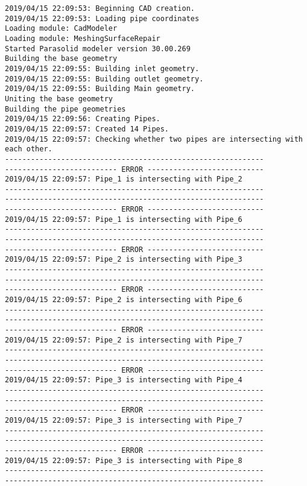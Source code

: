 \documentclass{article}
\begin{document}
{\tiny 
\begin{verbatim}
2019/04/15 22:09:53: Beginning CAD creation.
2019/04/15 22:09:53: Loading pipe coordinates
Loading module: CadModeler
Loading module: MeshingSurfaceRepair
Started Parasolid modeler version 30.00.269
Building the base geometry
2019/04/15 22:09:55: Building inlet geometry.
2019/04/15 22:09:55: Building outlet geometry.
2019/04/15 22:09:55: Building Main geometry.
Uniting the base geometry
Building the pipe geometries
2019/04/15 22:09:56: Creating Pipes.
2019/04/15 22:09:57: Created 14 Pipes.
2019/04/15 22:09:57: Checking whether two pipes are intersecting with each other.
------------------------------------------------------------
-------------------------- ERROR ---------------------------
2019/04/15 22:09:57: Pipe_1 is intersecting with Pipe_2
------------------------------------------------------------
------------------------------------------------------------
-------------------------- ERROR ---------------------------
2019/04/15 22:09:57: Pipe_1 is intersecting with Pipe_6
------------------------------------------------------------
------------------------------------------------------------
-------------------------- ERROR ---------------------------
2019/04/15 22:09:57: Pipe_2 is intersecting with Pipe_3
------------------------------------------------------------
------------------------------------------------------------
-------------------------- ERROR ---------------------------
2019/04/15 22:09:57: Pipe_2 is intersecting with Pipe_6
------------------------------------------------------------
------------------------------------------------------------
-------------------------- ERROR ---------------------------
2019/04/15 22:09:57: Pipe_2 is intersecting with Pipe_7
------------------------------------------------------------
------------------------------------------------------------
-------------------------- ERROR ---------------------------
2019/04/15 22:09:57: Pipe_3 is intersecting with Pipe_4
------------------------------------------------------------
------------------------------------------------------------
-------------------------- ERROR ---------------------------
2019/04/15 22:09:57: Pipe_3 is intersecting with Pipe_7
------------------------------------------------------------
------------------------------------------------------------
-------------------------- ERROR ---------------------------
2019/04/15 22:09:57: Pipe_3 is intersecting with Pipe_8
------------------------------------------------------------
------------------------------------------------------------

\end{verbatim}}
\end{document}
